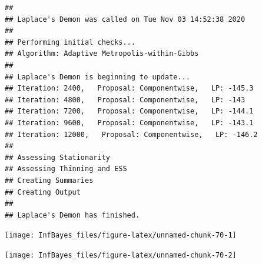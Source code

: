 \documentclass[
]{book}
\newenvironment{Shaded}{\begin{snugshade}}{\end{snugshade}}
\newcommand{\AttributeTok}[1]{\textcolor[rgb]{0.77,0.63,0.00}{#1}}
\newcommand{\CommentTok}[1]{\textcolor[rgb]{0.56,0.35,0.01}{\textit{#1}}}
\newcommand{\ConstantTok}[1]{\textcolor[rgb]{0.00,0.00,0.00}{#1}}
\newcommand{\DecValTok}[1]{\textcolor[rgb]{0.00,0.00,0.81}{#1}}
\newcommand{\FunctionTok}[1]{\textcolor[rgb]{0.00,0.00,0.00}{#1}}
\newcommand{\NormalTok}[1]{#1}
\newcommand{\OtherTok}[1]{\textcolor[rgb]{0.56,0.35,0.01}{#1}}
\newcommand{\SpecialCharTok}[1]{\textcolor[rgb]{0.00,0.00,0.00}{#1}}
\newcommand{\StringTok}[1]{\textcolor[rgb]{0.31,0.60,0.02}{#1}}
\begin{document}
\begin{verbatim}
## 
## Laplace's Demon was called on Tue Nov 03 14:52:38 2020
## 
## Performing initial checks...
## Algorithm: Adaptive Metropolis-within-Gibbs 
## 
## Laplace's Demon is beginning to update...
## Iteration: 2400,   Proposal: Componentwise,   LP: -145.3
## Iteration: 4800,   Proposal: Componentwise,   LP: -143
## Iteration: 7200,   Proposal: Componentwise,   LP: -144.1
## Iteration: 9600,   Proposal: Componentwise,   LP: -143.1
## Iteration: 12000,   Proposal: Componentwise,   LP: -146.2
## 
## Assessing Stationarity
## Assessing Thinning and ESS
## Creating Summaries
## Creating Output
## 
## Laplace's Demon has finished.
\end{verbatim}

\begin{Shaded}
\end{Shaded}

\begin{center}\texttt{[image: InfBayes\_files/figure-latex/unnamed-chunk-70-1]} \end{center}

\begin{center}\texttt{[image: InfBayes\_files/figure-latex/unnamed-chunk-70-2]} \end{center}
\end{document}
